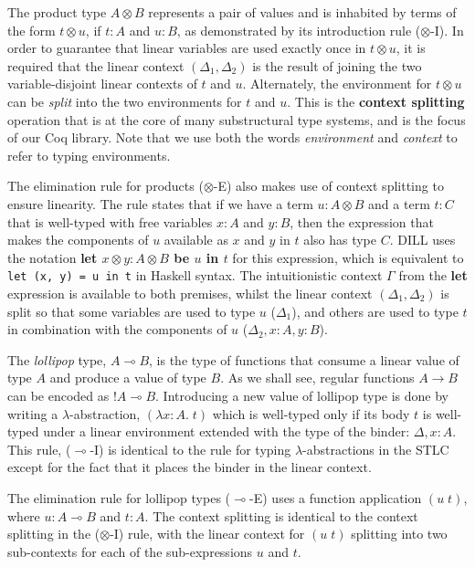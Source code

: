 \documentclass[]{unswthesis}
\newcommand{\lolly}{\multimap}
\let\c\texttt
\let\i\textit
\let\b\textbf
\begin{document}
The product type $A \otimes B$ represents a pair of values and is inhabited by terms of the form $t \otimes u$, if $t : A$ and $u : B$, as demonstrated by its introduction rule ($\otimes$-I). In order to guarantee that linear variables are used exactly once in $t \otimes u$, it is required that the linear context $(\Delta_1, \Delta_2)$ is the result of joining the two variable-disjoint linear contexts of $t$ and $u$. Alternately, the environment for $t \otimes u$ can be \i{split} into the two environments for $t$ and $u$. This is the \b{context splitting} operation that is at the core of many substructural type systems, and is the focus of our Coq library. Note that we use both the words \i{environment} and \i{context} to refer to typing environments.

The elimination rule for products ($\otimes$-E) also makes use of context splitting to ensure linearity. The rule states that if we have a term $u : A \otimes B$ and a term $t : C$ that is well-typed with free variables $x : A$ and $y : B$, then the expression that makes the components of $u$ available as $x$ and $y$ in $t$ also has type $C$. DILL uses the notation \b{let $x \otimes y : A \otimes B$ be $u$ in $t$} for this expression, which is equivalent to \c{let (x, y) = u in t} in Haskell syntax. The intuitionistic context $\Gamma$ from the \b{let} expression is available to both premises, whilst the linear context $(\Delta_1, \Delta_2)$ is split so that some variables are used to type $u$ ($\Delta_1$), and others are used to type $t$ in combination with the components of $u$ ($\Delta_2, x : A, y : B$).

The \i{lollipop} type, $A \lolly B$, is the type of functions that consume a linear value of type $A$ and produce a value of type $B$. As we shall see, regular functions $A \to B$ can be encoded as $!A \lolly B$. Introducing a new value of lollipop type is done by writing a $\lambda$-abstraction, $(\lambda x : A. \; t)$ which is well-typed only if its body $t$ is well-typed under a linear environment extended with the type of the binder: $\Delta, x : A$. This rule, ($\lolly$-I) is identical to the rule for typing $\lambda$-abstractions in the STLC except for the fact that it places the binder in the linear context.

The elimination rule for lollipop types ($\lolly$-E) uses a function application $(u \; t)$, where $u : A \lolly B$ and $t : A$. The context splitting is identical to the context splitting in the ($\otimes$-I) rule, with the linear context for $(u \; t)$ splitting into two sub-contexts for each of the sub-expressions $u$ and $t$.
\end{document}
